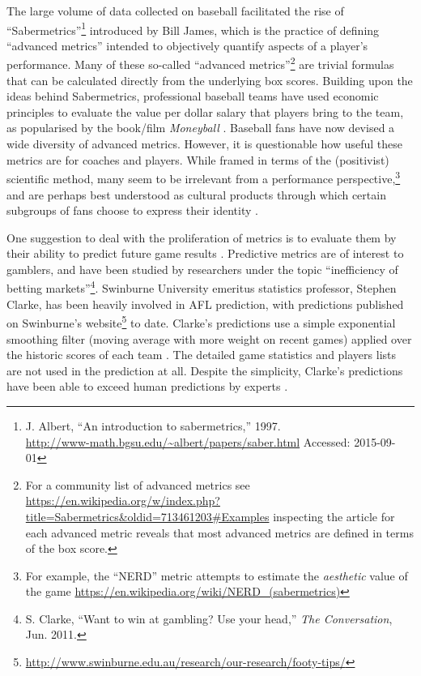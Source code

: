 The large volume of data collected on baseball facilitated the rise of
``Sabermetrics''\footnote{J. Albert, ``An introduction to
  sabermetrics,'' 1997.\\
  \mbox{\url{http://www-math.bgsu.edu/~albert/papers/saber.html}} Accessed:
  2015-09-01} %
  introduced by Bill James, which is the practice of
defining ``advanced metrics'' intended to objectively quantify aspects
of a player's performance. Many of these so-called ``advanced metrics''\footnote{For a community list of advanced metrics see
  \url{https://en.wikipedia.org/w/index.php?title=Sabermetrics\&oldid=713461203\#Examples}
  inspecting the article for each advanced metric reveals that most
  advanced metrics are defined in terms of the box score.} are trivial
formulas that can be calculated directly from the underlying box scores.
Building upon the ideas behind Sabermetrics, professional baseball teams
have used economic principles to evaluate the value per dollar salary
that players bring to the team, as popularised by the book/film
\textit{Moneyball} \cite{Lewis2004}. %
Baseball fans have now devised a wide diversity of advanced metrics.
However, it is questionable how useful these metrics are for coaches and
players. While framed in terms of the (positivist) scientific method, many seem to be irrelevant from a performance perspective,\footnote{For example, the ``NERD'' metric attempts to estimate the \textit{aesthetic} value of the game \url{https://en.wikipedia.org/wiki/NERD_(sabermetrics)}} and are perhaps best understood as cultural products through which certain subgroups of fans choose to express their identity \cite{Ngo2012}.

One suggestion to deal with the proliferation of metrics is to evaluate
them by their ability to predict future game results
\cite{Hughes2004}. Predictive metrics are of interest to
gamblers, and have been studied by researchers under the topic
``inefficiency of betting markets''\footnote{S. Clarke, ``Want to win at
  gambling? Use your head,'' \emph{The Conversation}, Jun. 2011.}.
Swinburne University emeritus statistics professor, Stephen Clarke, has
been heavily involved in AFL prediction, with predictions published on
Swinburne's website\footnote{\url{http://www.swinburne.edu.au/research/our-research/footy-tips/}} to date.
Clarke's predictions use a simple exponential smoothing filter (moving
average with more weight on recent games) applied over the historic
scores of each team \cite{clarke_computer_1993}. The detailed game
statistics and players lists are not used in the prediction at all.
Despite the simplicity, Clarke's predictions have been able to exceed
human predictions by experts \cite{clarke_computer_1993}.

